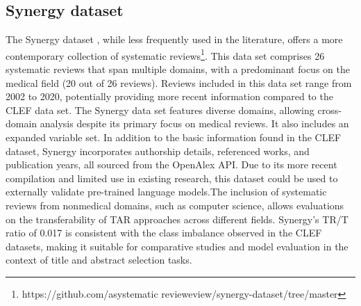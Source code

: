 \documentclass[10pt,oneside]{book}
\begin{document}
\subsection{Synergy dataset}
The Synergy dataset \cite{de_bruin_synergy_2023}, while less frequently used in the literature, offers a more contemporary collection of systematic reviews\footnote{https://github.com/asystematic revieweview/synergy-dataset/tree/master}. This data set comprises 26 systematic reviews that span multiple domains, with a predominant focus on the medical field (20 out of 26 reviews). Reviews included in this data set range from 2002 to 2020, potentially providing more recent information compared to the CLEF data set.
The Synergy data set features diverse domains, allowing cross-domain analysis despite its primary focus on medical reviews. It also includes an expanded variable set. In addition to the basic information found in the CLEF dataset, Synergy incorporates authorship details, referenced works, and publication years, all sourced from the OpenAlex API.
Due to its more recent compilation and limited use in existing research, this dataset could be used to externally validate pre-trained language models.The inclusion of systematic reviews from nonmedical domains, such as computer science, allows evaluations on the transferability of TAR approaches across different fields.
Synergy's TR/T ratio of 0.017 is consistent with the class imbalance observed in the CLEF datasets, making it suitable for comparative studies and model evaluation in the context of title and abstract selection tasks.


\end{document}
